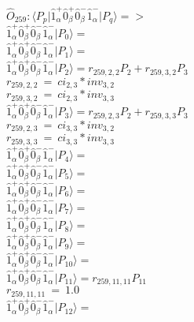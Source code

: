 \documentclass[14pt]{article}
\begin{document}
    $\hat{O}_{259}:  \langle{P_p}\vert \hat{1}_{\alpha}^{+}\hat{0}_{\beta}^{+}\hat{0}_{\beta}^{-}\hat{1}_{\alpha}^{-} \vert{P_q}\rangle => $ \\ 
    $ \hat{1}_{\alpha}^{+}\hat{0}_{\beta}^{+}\hat{0}_{\beta}^{-}\hat{1}_{\alpha}^{-} \vert{P_{0}}\rangle =  $ \\ 
    $ \hat{1}_{\alpha}^{+}\hat{0}_{\beta}^{+}\hat{0}_{\beta}^{-}\hat{1}_{\alpha}^{-} \vert{P_{1}}\rangle =  $ \\ 
    $ \hat{1}_{\alpha}^{+}\hat{0}_{\beta}^{+}\hat{0}_{\beta}^{-}\hat{1}_{\alpha}^{-} \vert{P_{2}}\rangle = {r}_{259,2,2}P_{2}+{r}_{259,3,2}P_{3} $ \\ 
    ${r}_{259,2,2}\ =\ {ci}_{2,3}*{inv}_{3,2} $ \\ 
    ${r}_{259,3,2}\ =\ {ci}_{2,3}*{inv}_{3,3} $ \\ 
    $ \hat{1}_{\alpha}^{+}\hat{0}_{\beta}^{+}\hat{0}_{\beta}^{-}\hat{1}_{\alpha}^{-} \vert{P_{3}}\rangle = {r}_{259,2,3}P_{2}+{r}_{259,3,3}P_{3} $ \\ 
    ${r}_{259,2,3}\ =\ {ci}_{3,3}*{inv}_{3,2} $ \\ 
    ${r}_{259,3,3}\ =\ {ci}_{3,3}*{inv}_{3,3} $ \\ 
    $ \hat{1}_{\alpha}^{+}\hat{0}_{\beta}^{+}\hat{0}_{\beta}^{-}\hat{1}_{\alpha}^{-} \vert{P_{4}}\rangle =  $ \\ 
    $ \hat{1}_{\alpha}^{+}\hat{0}_{\beta}^{+}\hat{0}_{\beta}^{-}\hat{1}_{\alpha}^{-} \vert{P_{5}}\rangle =  $ \\ 
    $ \hat{1}_{\alpha}^{+}\hat{0}_{\beta}^{+}\hat{0}_{\beta}^{-}\hat{1}_{\alpha}^{-} \vert{P_{6}}\rangle =  $ \\ 
    $ \hat{1}_{\alpha}^{+}\hat{0}_{\beta}^{+}\hat{0}_{\beta}^{-}\hat{1}_{\alpha}^{-} \vert{P_{7}}\rangle =  $ \\ 
    $ \hat{1}_{\alpha}^{+}\hat{0}_{\beta}^{+}\hat{0}_{\beta}^{-}\hat{1}_{\alpha}^{-} \vert{P_{8}}\rangle =  $ \\ 
    $ \hat{1}_{\alpha}^{+}\hat{0}_{\beta}^{+}\hat{0}_{\beta}^{-}\hat{1}_{\alpha}^{-} \vert{P_{9}}\rangle =  $ \\ 
    $ \hat{1}_{\alpha}^{+}\hat{0}_{\beta}^{+}\hat{0}_{\beta}^{-}\hat{1}_{\alpha}^{-} \vert{P_{10}}\rangle =  $ \\ 
    $ \hat{1}_{\alpha}^{+}\hat{0}_{\beta}^{+}\hat{0}_{\beta}^{-}\hat{1}_{\alpha}^{-} \vert{P_{11}}\rangle = {r}_{259,11,11}P_{11} $ \\ 
    ${r}_{259,11,11}\ =\ 1.0 $ \\ 
    $ \hat{1}_{\alpha}^{+}\hat{0}_{\beta}^{+}\hat{0}_{\beta}^{-}\hat{1}_{\alpha}^{-} \vert{P_{12}}\rangle =  $ \\ 
\end{document}
